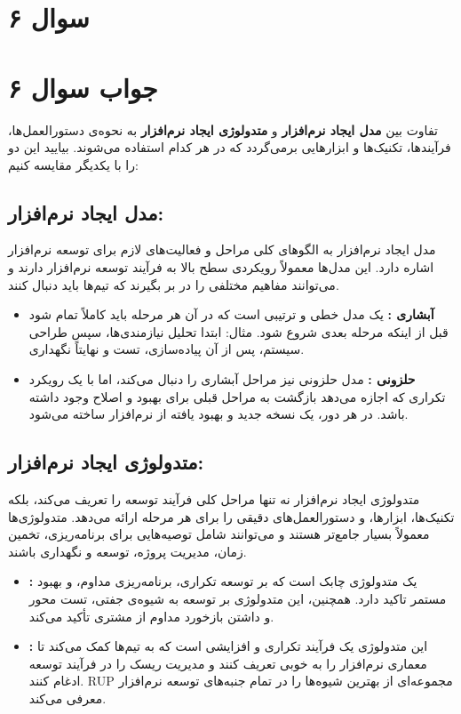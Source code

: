 \section*{سوال ۶}



\section*{جواب سوال ۶}

تفاوت بین
\textbf{مدل ایجاد نرم‌افزار}
و
\textbf{متدولوژی ایجاد نرم‌افزار}
به نحوه‌ی دستورالعمل‌ها، فرآیندها، تکنیک‌ها و ابزارهایی برمی‌گردد که در هر کدام استفاده می‌شوند. بیایید این دو را با یکدیگر مقایسه کنیم:

\subsection*{مدل ایجاد نرم‌افزار:}

مدل ایجاد نرم‌افزار به الگوهای کلی مراحل و فعالیت‌های لازم برای توسعه نرم‌افزار اشاره دارد. این مدل‌ها معمولاً رویکردی سطح بالا به فرآیند توسعه نرم‌افزار دارند و می‌توانند مفاهیم مختلفی را در بر بگیرند که تیم‌ها باید دنبال کنند.

\begin{itemize}
	\item \textbf{آبشاری  :}
یک مدل خطی و ترتیبی است که در آن هر مرحله باید کاملاً تمام شود قبل از اینکه مرحله بعدی شروع شود. مثال: ابتدا تحلیل نیازمندی‌ها، سپس طراحی سیستم، پس از آن پیاده‌سازی، تست و نهایتاً نگهداری.
	\item \textbf{حلزونی  :}
مدل حلزونی نیز مراحل آبشاری را دنبال می‌کند، اما با یک رویکرد تکراری که اجازه می‌دهد بازگشت به مراحل قبلی برای بهبود و اصلاح وجود داشته باشد. در هر دور، یک نسخه جدید و بهبود یافته از نرم‌افزار ساخته می‌شود.
\end{itemize}

\subsection*{متدولوژی ایجاد نرم‌افزار:}

متدولوژی ایجاد نرم‌افزار نه تنها مراحل کلی فرآیند توسعه را تعریف می‌کند، بلکه تکنیک‌ها، ابزارها، و دستورالعمل‌های دقیقی را برای هر مرحله ارائه می‌دهد. متدولوژی‌ها معمولاً بسیار جامع‌تر هستند و می‌توانند شامل توصیه‌هایی برای برنامه‌ریزی، تخمین زمان، مدیریت پروژه، توسعه و نگهداری باشند.

\begin{itemize}
	\item \textbf{ :}
یک متدولوژی چابک است که بر توسعه تکراری، برنامه‌ریزی مداوم، و بهبود مستمر تاکید دارد. همچنین، این متدولوژی بر توسعه به شیوه‌ی جفتی، تست محور و داشتن بازخورد مداوم از مشتری تأکید می‌کند.

	\item \textbf{ :}
این متدولوژی یک فرآیند تکراری و افزایشی است که به تیم‌ها کمک می‌کند تا معماری نرم‌افزار را به خوبی تعریف کنند و مدیریت ریسک را در فرآیند توسعه ادغام کنند. RUP مجموعه‌ای از بهترین شیوه‌ها را در تمام جنبه‌های توسعه نرم‌افزار معرفی می‌کند.
\end{itemize}

